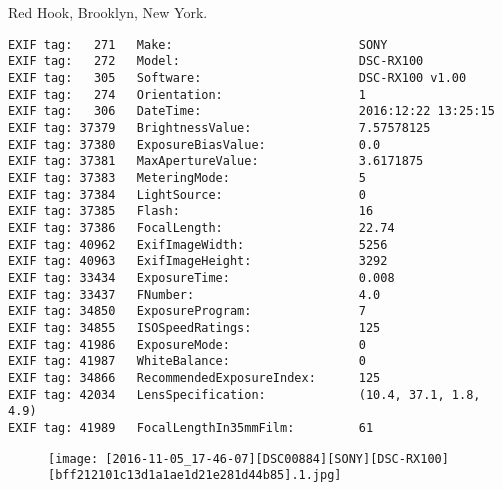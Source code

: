 \section{\protect{}}
\noindent Red Hook, Brooklyn, New York.
\noindent
\begin{lstlisting}
EXIF tag:   271   Make:                          SONY
EXIF tag:   272   Model:                         DSC-RX100
EXIF tag:   305   Software:                      DSC-RX100 v1.00
EXIF tag:   274   Orientation:                   1
EXIF tag:   306   DateTime:                      2016:12:22 13:25:15
EXIF tag: 37379   BrightnessValue:               7.57578125
EXIF tag: 37380   ExposureBiasValue:             0.0
EXIF tag: 37381   MaxApertureValue:              3.6171875
EXIF tag: 37383   MeteringMode:                  5
EXIF tag: 37384   LightSource:                   0
EXIF tag: 37385   Flash:                         16
EXIF tag: 37386   FocalLength:                   22.74
EXIF tag: 40962   ExifImageWidth:                5256
EXIF tag: 40963   ExifImageHeight:               3292
EXIF tag: 33434   ExposureTime:                  0.008
EXIF tag: 33437   FNumber:                       4.0
EXIF tag: 34850   ExposureProgram:               7
EXIF tag: 34855   ISOSpeedRatings:               125
EXIF tag: 41986   ExposureMode:                  0
EXIF tag: 41987   WhiteBalance:                  0
EXIF tag: 34866   RecommendedExposureIndex:      125
EXIF tag: 42034   LensSpecification:             (10.4, 37.1, 1.8, 4.9)
EXIF tag: 41989   FocalLengthIn35mmFilm:         61

\end{lstlisting}
\clearpage
\begin{figure}
\raggedleft
\texttt{[image: [2016-11-05\_17-46-07][DSC00884][SONY][DSC-RX100][bff212101c13d1a1ae1d21e281d44b85].1.jpg]}
\end{figure}


\clearpage
